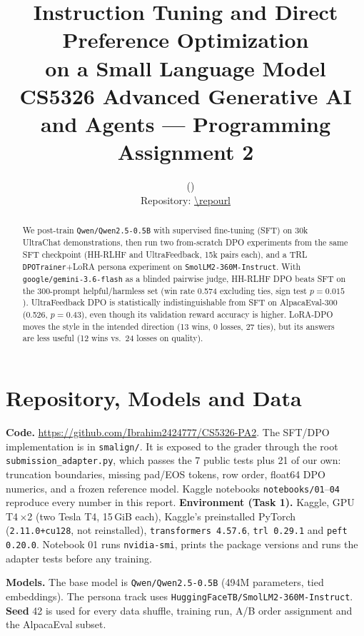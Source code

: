 \documentclass[10pt,a4paper]{article}
\title{\vspace{-1.6em}\textbf{Instruction Tuning and Direct Preference Optimization\\on a Small Language Model}\\[2pt]
\large CS5326 Advanced Generative AI and Agents --- Programming Assignment 2}
\author{\studentname\ \ (\rollnumber)\\[1pt]\small Repository: \url{\repourl}}
\date{}
\newcommand{\repourl}{https://github.com/Ibrahim2424777/CS5326-PA2}
\newcommand{\code}[1]{\texttt{\small #1}}
\begin{document}
\maketitle
\vspace{-2.4em}

\begin{abstract}
\noindent We post-train \code{Qwen/Qwen2.5-0.5B} with supervised fine-tuning (SFT) on 30k UltraChat
demonstrations, then run two from-scratch DPO experiments from the same SFT checkpoint (HH-RLHF and
UltraFeedback, 15k pairs each), and a TRL \code{DPOTrainer}+LoRA persona experiment on
\code{SmolLM2-360M-Instruct}. With \code{google/gemini-3.6-flash} as a blinded pairwise judge, HH-RLHF DPO beats SFT on
the 300-prompt helpful/harmless set (win rate 0.574 excluding ties, sign test $p{=}0.015$). UltraFeedback DPO is
statistically indistinguishable from SFT on AlpacaEval-300 (0.526, $p{=}0.43$), even though its validation reward
accuracy is higher. LoRA-DPO moves the style in the intended direction (13 wins, 0 losses, 27 ties), but its answers
are less useful (12 wins vs.\ 24 losses on quality).
\end{abstract}

\section{Repository, Models and Data}\label{sec:data}

\textbf{Code.} \url{\repourl}. The SFT/DPO implementation is in \code{smalign/}. It is exposed to the grader through
the root \code{submission\_adapter.py}, which passes the 7 public tests plus 21 of our own: truncation boundaries,
missing pad/EOS tokens, row order, float64 DPO numerics, and a frozen reference model. Kaggle notebooks
\code{notebooks/01}--\code{04} reproduce every number in this report.
\textbf{Environment (Task 1).} Kaggle, GPU T4\,$\times$2 (two Tesla T4, 15\,GiB each), Kaggle's preinstalled PyTorch
(\code{2.11.0+cu128}, not reinstalled), \code{transformers 4.57.6}, \code{trl 0.29.1} and \code{peft 0.20.0}. Notebook 01
runs \code{nvidia-smi}, prints the package versions and runs the adapter tests before any training.

\textbf{Models.} The base model is \code{Qwen/Qwen2.5-0.5B} (494M parameters, tied embeddings). The persona track uses
\code{HuggingFaceTB/SmolLM2-360M-Instruct}. \textbf{Seed} 42 is used for every data shuffle, training run, A/B order
assignment and the AlpacaEval subset.
\end{document}
